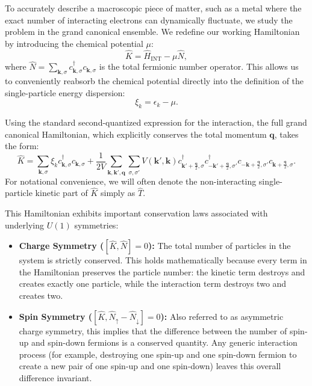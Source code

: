 To accurately describe a macroscopic piece of matter, such as a metal where the exact number of interacting electrons can dynamically fluctuate, we study the problem in the grand canonical ensemble. We redefine our working Hamiltonian by introducing the chemical potential \( \mu \):
\[
    \hat{K} = \hat{H}_{\text{INT}} - \mu \hat{N},
\]
where \( \hat{N} = \sum_{\mathbf{k},\sigma} c_{\mathbf{k},\sigma}^\dagger c_{\mathbf{k},\sigma} \) is the total fermionic number operator. This allows us to conveniently reabsorb the chemical potential directly into the definition of the single-particle energy dispersion:
\[
    \xi_k = \epsilon_k - \mu.
\]

Using the standard second-quantized expression for the interaction, the full grand canonical Hamiltonian, which explicitly conserves the total momentum \( \mathbf{q} \), takes the form:
\[
    \hat{K} = \sum_{\mathbf{k},\sigma} \xi_k c_{\mathbf{k},\sigma}^\dagger c_{\mathbf{k},\sigma} + \frac{1}{2V} \sum_{\mathbf{k},\mathbf{k}',\mathbf{q}} \sum_{\sigma,\sigma'} V(\mathbf{k}', \mathbf{k}) c_{\mathbf{k}'+\frac{\mathbf{q}}{2},\sigma}^\dagger c_{-\mathbf{k}'+\frac{\mathbf{q}}{2},\sigma'}^\dagger c_{-\mathbf{k}+\frac{\mathbf{q}}{2},\sigma'} c_{\mathbf{k}+\frac{\mathbf{q}}{2},\sigma}.
\]
For notational convenience, we will often denote the non-interacting single-particle kinetic part of \( \hat{K} \) simply as \( \hat{T} \).

This Hamiltonian exhibits important conservation laws associated with underlying \( U(1) \) symmetries:
\begin{itemize}
    \item \textbf{Charge Symmetry (\( [\hat{K}, \hat{N}] = 0 \)):} The total number of particles in the system is strictly conserved. This holds mathematically because every term in the Hamiltonian preserves the particle number: the kinetic term destroys and creates exactly one particle, while the interaction term destroys two and creates two.
    \item \textbf{Spin Symmetry (\( [\hat{K}, \hat{N}_\uparrow - \hat{N}_\downarrow] = 0 \)):} Also referred to as asymmetric charge symmetry, this implies that the difference between the number of spin-up and spin-down fermions is a conserved quantity. Any generic interaction process (for example, destroying one spin-up and one spin-down fermion to create a new pair of one spin-up and one spin-down) leaves this overall difference invariant.
\end{itemize}

